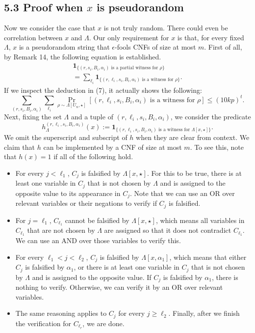 \documentclass[10pt,a4paper]{article}
\begin{document}
\subsection*{5.3 Proof when $x$ is pseudorandom}
Now we consider the case that $x$ is not truly random. There could even be correlation between $x$ and $\Lambda$. Our only requirement for $x$ is that, for every fixed $\Lambda$, $x$ is a pseudorandom string that $\epsilon$-fools CNFs of size at most $m$. First of all, by Remark 14, the following equation is established.
\begin{multline*}\mathbf1_{\{(r,s_i,B_i,\alpha_i)\text{ is a partial witness for }\rho\}}\\=\sum_{\ell_i}\mathbf1_{\{(r,\ell_i,s_i,B_i,\alpha_i)\text{ is a witness for }\rho\}}.\tag{8}\end{multline*}
If we inspect the deduction in (7), it actually shows the following:
\[\sum_{(r,s_i,B_i,\alpha_i)}\sum_{\ell_i}\Pr_{\rho\sim\Lambda[U_n,\star]}[(r,\ell_i,s_i,B_i,\alpha_i)\text{ is a witness for }\rho]\le(10kp)^t.\tag{9}\]
Next, fixing the set $\Lambda$ and a tuple of $(r,\ell_i,s_i,B_i,\alpha_i)$, we consider the predicate
\[h_\Lambda^{(r,\ell_i,s_i,B_i,\alpha_i)}(x):=\mathbf1_{\{(r,\ell_i,s_i,B_i,\alpha_i)\text{ is a witness for }\Lambda[x,\star]\}}.\]
We omit the superscript and subscript of $h$ when they are clear from context. We claim that $h$ can be implemented by a CNF of size at most $m$. To see this, note that $h(x)=1$ if all of the following hold.
\begin{itemize}\item For every $j<\ell_1$, $C_j$ is falsified by $\Lambda[x,\star]$. For this to be true, there is at least one variable in $C_j$ that is not chosen by $\Lambda$ and is assigned to the opposite value to its appearance in $C_j$. Note that we can use an OR over relevant variables or their negations to verify if $C_j$ is falsified.
\item For $j=\ell_1$, $C_{\ell_1}$ cannot be falsified by $\Lambda[x,\star]$, which means all variables in $C_{\ell_1}$ that are not chosen by $\Lambda$ are assigned so that it does not contradict $C_{\ell_1}$. We can use an AND over those variables to verify this.
\item For every $\ell_1<j<\ell_2$, $C_j$ is falsified by $\Lambda[x,\alpha_1]$, which means that either $C_j$ is falsified by $\alpha_1$, or there is at least one variable in $C_j$ that is not chosen by $\Lambda$ and is assigned to the opposite value. If $C_j$ is falsified by $\alpha_1$, there is nothing to verify. Otherwise, we can verify it by an OR over relevant variables.
\item The same reasoning applies to $C_j$ for every $j\ge\ell_2$. Finally, after we finish the verification for $C_{\ell_r}$, we are done.\end{itemize}
\end{document}
